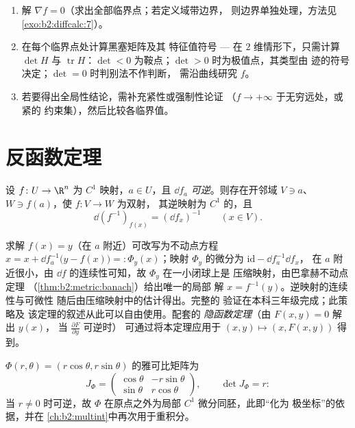 \begin{method}\label{met:b2:diffcalc:extrema}
\begin{enumerate}
  \item 解 $\nabla f = 0$（求出全部临界点；若定义域带边界，
        则边界单独处理，方法见
        \cref{exo:b2:diffcalc:7}）。
  \item 在每个临界点处计算黑塞矩阵及其
        特征值符号 --- 在 $2$ 维情形下，只需计算 $\det H$
        与 $\operatorname{tr} H$：$\det < 0$ 为鞍点；$\det >
        0$ 时为极值点，其类型由
        迹的符号决定；$\det = 0$ 时判别法不作判断，
        需沿曲线研究 $f$。
  \item 若要得出全局性结论，需补充紧性或强制性论证
        （$f \to +\infty$ 于无穷远处，或紧的
        约束集），然后比较各临界值。
\end{enumerate}
\end{method}

\section{反函数定理}

\begin{theorem}[反函数定理]\label{thm:b2:diffcalc:inverse}
设 $f \colon U \to \R^n$ 为 $C^1$ 映射，$a \in U$，且 $\dd f_a$
\emph{可逆}。则存在开邻域 $V \ni a$、$W
\ni f(a)$，使 $f \colon V \to W$ 为双射，
其逆映射为 $C^1$ 的，且
\[
\dd (f^{-1})_{f(x)} = (\dd f_x)^{-1} \qquad (x \in V).
\]
\end{theorem}
\admitted

\begin{remark}
求解 $f(x) = y$（在 $a$ 附近）可改写为不动点方程
$x = x + \dd f_a^{-1}\bigl(y - f(x)\bigr) =: \Phi_y(x)$；映射
$\Phi_y$ 的微分为 $\mathrm{id} - \dd f_a^{-1}\dd f_x$，
在 $a$ 附近很小，由 $\dd f$ 的连续性可知，故 $\Phi_y$ 在一小闭球上是
压缩映射，由巴拿赫不动点定理
（\cref{thm:b2:metric:banach}）给出唯一的局部
解 $x = f^{-1}(y)$。逆映射的连续性与可微性
随后由压缩映射中的估计得出。完整的
验证在本科三年级完成；此策略及
该定理的叙述从此可以自由使用。配套的
\emph{隐函数定理}（由 $F(x, y) = 0$ 解出 $y(x)$，
当 $\frac{\partial F}{\partial y}$ 可逆时）
可通过将本定理应用于 $(x, y) \mapsto (x, F(x,y))$ 得到。
\end{remark}

\begin{example}[极坐标]\label{ex:b2:diffcalc:polar}
$\Phi(r, \theta) = (r\cos\theta, r\sin\theta)$ 的雅可比矩阵为
\[
J_\Phi = \begin{pmatrix} \cos\theta & -r\sin\theta\\ \sin\theta &
r\cos\theta \end{pmatrix},
\qquad \det J_\Phi = r :
\]
当 $r \neq 0$ 时可逆，故 $\Phi$ 在原点之外为局部 $C^1$
微分同胚，此即“化为
极坐标”的依据，并在
\cref{ch:b2:multint}中再次用于重积分。
\end{example}

